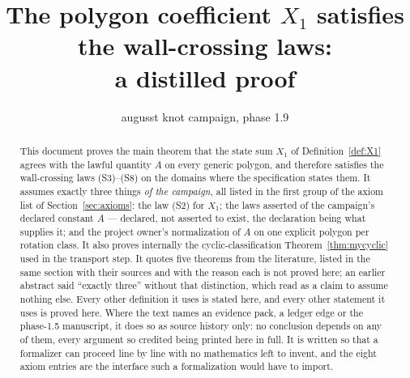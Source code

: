 \documentclass[11pt]{article}
\title{The polygon coefficient $X_1$ satisfies the wall-crossing laws:\\
a distilled proof}
\author{augusst knot campaign, phase 1.9}
\date{}
\theoremstyle{definition}
\theoremstyle{remark}
\begin{document}
\maketitle

\begin{abstract}
This document proves the main theorem that the state sum $X_1$ of
Definition~\ref{def:X1} agrees with the lawful quantity $A$ on every generic
polygon, and therefore satisfies the wall-crossing laws (S3)--(S8) on the
domains where the specification states them. It assumes exactly three
things \emph{of the campaign}, all listed in the first group of the axiom list
of Section~\ref{sec:axioms}: the law (S2) for $X_1$; the laws asserted of the
campaign's declared constant $A$ --- declared, not asserted to exist, the
declaration being what supplies it; and the project owner's normalization of
$A$ on one explicit polygon per rotation class. It also proves internally the
cyclic-classification Theorem~\ref{thm:mycyclic} used in the transport step.
It quotes five theorems from the literature, listed in the same section with
their sources and with the reason each is not proved here; an earlier abstract
said ``exactly three'' without that distinction, which read as a claim to
assume nothing else.
Every other definition it uses is stated here, and every other statement it
uses is proved here. Where the text names an evidence pack, a ledger edge or
the phase-1.5 manuscript, it does so as source history only: no conclusion
depends on any of them, every argument so credited being printed here in
full. It is written so that a formalizer can proceed line by line with no
mathematics left to invent, and the eight axiom entries are the interface
such a formalization would have to import.
\end{abstract}

\tableofcontents













\end{document}
